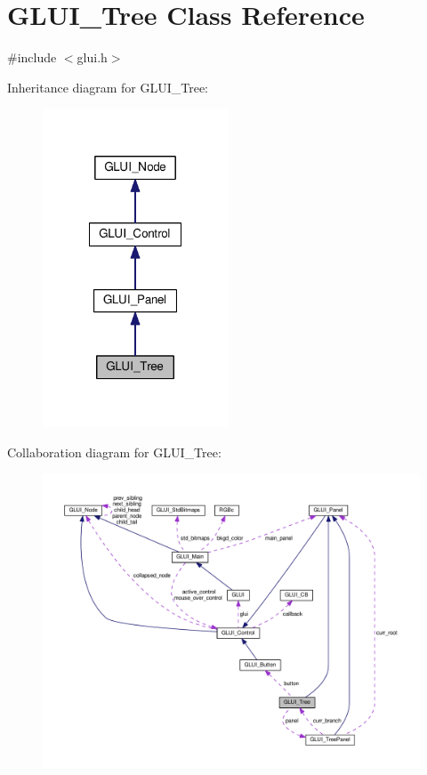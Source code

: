 \hypertarget{class_g_l_u_i___tree}{\section{G\+L\+U\+I\+\_\+\+Tree Class Reference}
\label{class_g_l_u_i___tree}
}


{\ttfamily \#include $<$glui.\+h$>$}



Inheritance diagram for G\+L\+U\+I\+\_\+\+Tree\+:\nopagebreak
\begin{figure}[H]
\begin{center}
\leavevmode
\includegraphics[width=156pt]{class_g_l_u_i___tree__inherit__graph}
\end{center}
\end{figure}


Collaboration diagram for G\+L\+U\+I\+\_\+\+Tree\+:\nopagebreak
\begin{figure}[H]
\begin{center}
\leavevmode
\includegraphics[width=350pt]{class_g_l_u_i___tree__coll__graph}
\end{center}
\end{figure}
